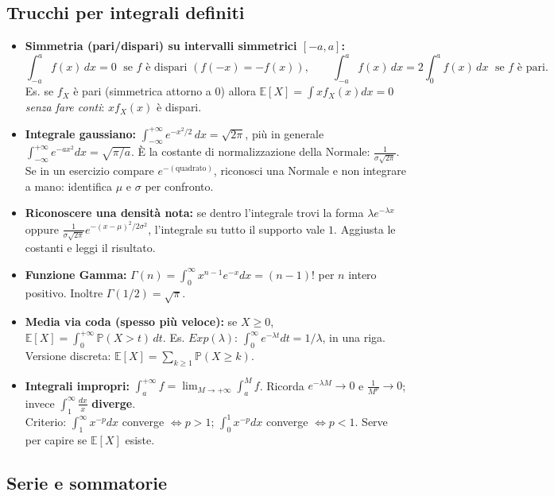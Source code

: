 \documentclass[12pt]{extarticle} %
\begin{document}
\subsection{Trucchi per integrali definiti}
\begin{itemize}
    \item \textbf{Simmetria (pari/dispari) su intervalli simmetrici $[-a,a]$:}
    \[
    \int_{-a}^{a} f(x)\,dx = 0 \;\text{ se } f \text{ è dispari } (f(-x)=-f(x)), \qquad
    \int_{-a}^{a} f(x)\,dx = 2\int_0^{a} f(x)\,dx \;\text{ se } f \text{ è pari}.
    \]
    {\footnotesize Es. se $f_X$ è pari (simmetrica attorno a $0$) allora $\mathbb{E}[X] = \int x f_X(x)dx = 0$ \emph{senza fare conti}: $x f_X(x)$ è dispari.}
    \item \textbf{Integrale gaussiano:} $\displaystyle\int_{-\infty}^{+\infty} e^{-x^2/2}\,dx = \sqrt{2\pi}$, \; più in generale $\int_{-\infty}^{+\infty} e^{-a x^2}dx = \sqrt{\pi/a}$. {\footnotesize È la costante di normalizzazione della Normale: $\frac{1}{\sigma\sqrt{2\pi}}$. Se in un esercizio compare $e^{-(\text{quadrato})}$, riconosci una Normale e non integrare a mano: identifica $\mu$ e $\sigma$ per confronto.}
    \item \textbf{Riconoscere una densità nota:} se dentro l'integrale trovi la forma $\lambda e^{-\lambda x}$ oppure $\frac{1}{\sigma\sqrt{2\pi}}e^{-(x-\mu)^2/2\sigma^2}$, l'integrale su tutto il supporto vale $1$. Aggiusta le costanti e leggi il risultato.
    \item \textbf{Funzione Gamma:} $\Gamma(n) = \int_0^{\infty} x^{n-1}e^{-x}dx = (n-1)!$ \; per $n$ intero positivo. Inoltre $\Gamma(1/2) = \sqrt{\pi}$.
    \item \textbf{Media via coda (spesso più veloce):} se $X \ge 0$, \; $\displaystyle\mathbb{E}[X] = \int_0^{+\infty} \mathbb{P}(X>t)\,dt$. {\footnotesize Es. $Exp(\lambda)$: $\int_0^\infty e^{-\lambda t}dt = 1/\lambda$, in una riga. Versione discreta: $\mathbb{E}[X]=\sum_{k\ge 1}\mathbb{P}(X \ge k)$.}
    \item \textbf{Integrali impropri:} $\int_a^{+\infty} f = \lim_{M\to+\infty}\int_a^{M} f$. Ricorda $e^{-\lambda M}\to 0$ e $\frac{1}{M^{p}}\to 0$; invece $\int_1^{\infty}\frac{dx}{x}$ \textbf{diverge}. \\ {\footnotesize Criterio: $\int_1^{\infty} x^{-p}dx$ converge $\iff p>1$; \; $\int_0^{1} x^{-p}dx$ converge $\iff p<1$. Serve per capire se $\mathbb{E}[X]$ esiste.}
\end{itemize}

\subsection{Serie e sommatorie}
\end{document}
